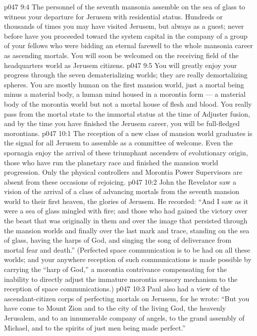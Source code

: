 \vs p047 9:4 The personnel of the seventh mansonia assemble on the sea of glass to witness your departure for Jerusem with residential status. Hundreds or thousands of times you may have visited Jerusem, but always as a guest; never before have you proceeded toward the system capital in the company of a group of your fellows who were bidding an eternal farewell to the whole mansonia career as ascending mortals. You will soon be welcomed on the receiving field of the headquarters world as Jerusem citizens.
\vs p047 9:5 \pc You will greatly enjoy your progress through the seven dematerializing worlds; they are really demortalizing spheres. You are mostly human on the first mansion world, just a mortal being minus a material body, a human mind housed in a morontia form --- a material body of the morontia world but not a mortal house of flesh and blood. You really pass from the mortal state to the immortal status at the time of Adjuster fusion, and by the time you have finished the Jerusem career, you will be full\hyp{}fledged morontians.
\vs p047 10:1 The reception of a new class of mansion world graduates is the signal for all Jerusem to assemble as a committee of welcome. Even the spornagia enjoy the arrival of these triumphant ascenders of evolutionary origin, those who have run the planetary race and finished the mansion world progression. Only the physical controllers and Morontia Power Supervisors are absent from these occasions of rejoicing.
\vs p047 10:2 \pc John the Revelator saw a vision of the arrival of a class of advancing mortals from the seventh mansion world to their first heaven, the glories of Jerusem. He recorded: “And I saw as it were a sea of glass mingled with fire; and those who had gained the victory over the beast that was originally in them and over the image that persisted through the mansion worlds and finally over the last mark and trace, standing on the sea of glass, having the harps of God, and singing the song of deliverance from mortal fear and death.” (Perfected space communication is to be had on all these worlds; and your anywhere reception of such communications is made possible by carrying the “harp of God,” a morontia contrivance compensating for the inability to directly adjust the immature morontia sensory mechanism to the reception of space communications.)
\vs p047 10:3 Paul also had a view of the ascendant\hyp{}citizen corps of perfecting mortals on Jerusem, for he wrote: “But you have come to Mount Zion and to the city of the living God, the heavenly Jerusalem, and to an innumerable company of angels, to the grand assembly of Michael, and to the spirits of just men being made perfect.”

